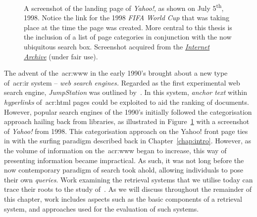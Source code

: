 \begin{figure}[t!]
    \centering
    \caption[Screenshot of \emph{Yahoo!} Search, July 1998]{A screenshot of the landing page of \emph{Yahoo!}, as shown on July 5\textsuperscript{th}, 1998. Notice the link for the 1998 \emph{FIFA World Cup} that was taking place at the time the page was created. More central to this thesis is the inclusion of a list of page categories in conjunction with the now ubiquitous search box. Screenshot acquired from the \href{https://web.archive.org/web/19980705003104/http://www.yahoo.com}{\emph{Internet Archive}} (under fair use).}
    \label{fig:yahoo}
\end{figure}

The advent of the~\gls{acr:www} in the early 1990's brought about a new type of~\gls{acr:ir} system -- \emph{web search engines.} Regarded as the first experimental web search engine, \emph{JumpStation} was outlined by~\cite{mcbryan1994taming_tools}. In this system, \emph{anchor text} within \emph{hyperlinks} of~\gls{acr:html} pages could be exploited to aid the ranking of documents. However, popular search engines of the 1990's initially followed the categorisation approach hailing back from libraries, as illustrated in Figure~\ref{fig:yahoo} with a screenshot of \emph{Yahoo!} from 1998. This categorisation approach on the Yahoo! front page ties in with the surfing paradigm described back in Chapter~\ref{chap:intro}. However, as the volume of information on the~\gls{acr:www} began to increase, this way of presenting information became impractical. As such, it was not long before the now contemporary paradigm of search took ahold, allowing individuals to pose their own \emph{queries}. Work examining the retrieval systems that we utilise today can trace their roots to the study of~. As we will discuss throughout the remainder of this chapter, work includes aspects such as the basic components of a retrieval system, and approaches used for the evaluation of such systems.

